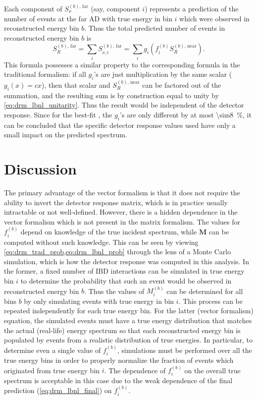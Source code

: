 Each component of $S_\nu^{(b),\,\text{far}}$ (say, component $i$) represents
a prediction of
the number of \nuebar{} events at the far AD with true energy in bin $i$
which were observed in reconstructed energy bin $b$.
Thus the total predicted number of events in reconstructed energy bin $b$ is
\begin{equation}\label{eq:drm_lbnl_final}
    S_R^{(b),\,\text{far}} = \sum_i S_{\nu,i}^{(b),\,\text{far}}
    = \sum_i g_i(f_i^{(b)}S_R^{(b),\,\text{near}}).
\end{equation}
This formula possesses a similar property to the corresponding formula
in the traditional formalism:
if all $g_i$'s are just multiplication by the same scalar ($g_i(x) = cx$),
then that scalar and $S_R^{(b),\,\text{near}}$
can be factored out of the summation,
and the resulting sum is by construction
equal to unity by \cref{eq:drm_lbnl_unitarity}.
Thus the result would be independent of the detector response.
Since for the best-fit \thetaot{}, the $g_i$'s are only different
by at most \SI{\sim8}{\percent},
it can be concluded that the specific detector response values used
have only a small impact on the predicted spectrum.

\section{Discussion}
\label{sec:drm_comparison}

The primary advantage of the vector formalism
is that it does not require the ability to invert the detector response matrix,
which is in practice usually intractable or not well-defined.
However, there is a hidden dependence in the vector formalism
which is not present in the matrix formalism.
The values for $f_i^{(b)}$ depend on knowledge of
the true incident \nuebar{} spectrum,
while $\mathbf{M}$ can be computed without such knowledge.
This can be seen by viewing \cref{eq:drm_trad_prob,eq:drm_lbnl_prob}
through the lens of a Monte Carlo simulation,
which is how the detector response was computed in this analysis.
In the former, a fixed number of IBD interactions can be simulated
in true \nuebar{} energy bin $i$ to determine the probability
that such an event would be observed in reconstructed energy bin $b$.
Thus the values of $M_i^{(b)}$ can be determined for all bins $b$
by only simulating events with true energy in bin $i$.
This process can be repeated independently for each true energy bin.
For the latter (vector formalism) equation,
the simulated events must have a true \nuebar{} energy distribution
that matches the actual (real-life) \nuebar{} energy spectrum
so that each reconstructed energy bin is populated
by events from a realistic distribution of true energies.
In particular, to determine even a single value of $f_i^{(b)}$,
simulations must be performed over all the true energy bins
in order to properly normalize the fraction of events
which originated from true energy bin $i$.
The dependence of $f_i^{(b)}$ on the overall true \nuebar{} spectrum
is acceptable in this case
due to the weak dependence of the final prediction (\cref{eq:drm_lbnl_final})
on $f_i^{(b)}$.

